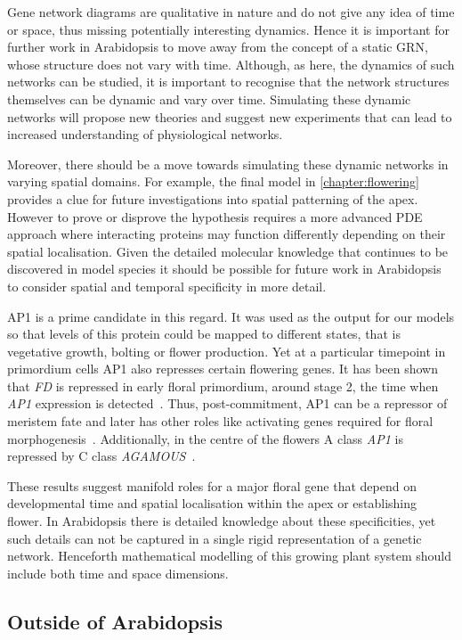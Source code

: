 Gene network diagrams are qualitative in nature and do not give any idea of time or space, thus missing potentially interesting dynamics.
Hence it is important for further work in Arabidopsis to move away from the concept of a static GRN, whose structure does not vary with time.
Although, as here, the dynamics of such networks can be studied, it is important to recognise that the network structures themselves can be dynamic and vary over time.
Simulating these dynamic networks will propose new theories and suggest new experiments that can lead to increased understanding of physiological networks.

Moreover, there should be a move towards simulating these dynamic networks in varying spatial domains.
For example, the final model in \autoref{chapter:flowering} provides a clue for future investigations into spatial patterning of the apex.
However to prove or disprove the hypothesis requires a more advanced PDE approach where interacting proteins may function differently depending on their spatial localisation.
Given the detailed molecular knowledge that continues to be discovered in model species it should be possible for future work in Arabidopsis to consider spatial and temporal specificity in more detail.

AP1 is a prime candidate in this regard.
It was used as the output for our models so that levels of this protein could be mapped to different states, that is vegetative growth, bolting or flower production.
Yet at a particular timepoint in primordium cells AP1 also represses certain flowering genes.
It has been shown that \emph{FD} is repressed in early floral primordium, around stage 2, the time when \emph{AP1} expression is detected~\cite{wigge2005}.
Thus, post-commitment, AP1 can be a repressor of meristem fate and later has other roles like activating genes required for floral morphogenesis~\cite{kaufmann2010}.
Additionally, in the centre of the flowers A class \emph{AP1} is repressed by C class \emph{AGAMOUS}~\cite{gustafson1994}.

These results suggest manifold roles for a major floral gene that depend on developmental time and spatial localisation within the apex or establishing flower.
In Arabidopsis there is detailed knowledge about these specificities, yet such details can not be captured in a single rigid representation of a genetic network.
Henceforth mathematical modelling of this growing plant system should include both time and space dimensions.

\subsection{Outside of Arabidopsis}

